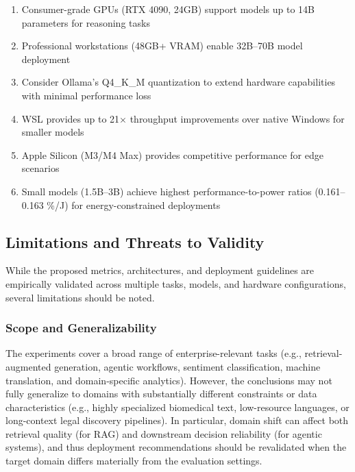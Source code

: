 \begin{enumerate}[leftmargin=*]
    \item Consumer-grade GPUs (RTX 4090, 24GB) support models up to 14B parameters for reasoning tasks
    \item Professional workstations (48GB+ VRAM) enable 32B--70B model deployment
    \item Consider Ollama's Q4\_K\_M quantization to extend hardware capabilities with minimal performance loss
    \item WSL provides up to 21$\times$ throughput improvements over native Windows for smaller models
    \item Apple Silicon (M3/M4 Max) provides competitive performance for edge scenarios
    \item Small models (1.5B--3B) achieve highest performance-to-power ratios (0.161--0.163 \%/J) for energy-constrained deployments
\end{enumerate}


\subsection{Limitations and Threats to Validity}
\label{sec:limitations}

While the proposed metrics, architectures, and deployment guidelines are empirically validated across multiple tasks, models, and hardware configurations, several limitations should be noted.

\subsubsection{Scope and Generalizability}
\label{sec:limitations-scope}
The experiments cover a broad range of enterprise-relevant tasks (e.g., retrieval-augmented generation, agentic workflows, sentiment classification, machine translation, and domain-specific analytics). However, the conclusions may not fully generalize to domains with substantially different constraints or data characteristics (e.g., highly specialized biomedical text, low-resource languages, or long-context legal discovery pipelines). In particular, domain shift can affect both retrieval quality (for RAG) and downstream decision reliability (for agentic systems), and thus deployment recommendations should be revalidated when the target domain differs materially from the evaluation settings.

